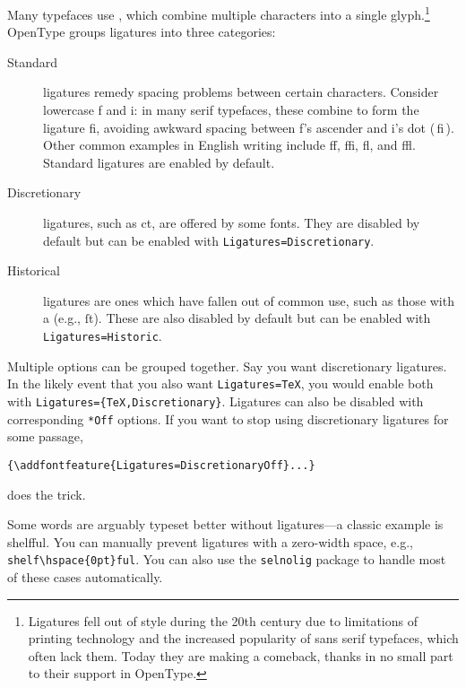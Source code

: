 Many typefaces use , which combine multiple characters
into a single glyph.\punckern\footnote{Ligatures fell out
of style during the 20{th}
century due to limitations of printing technology and the increased popularity
of sans serif typefaces, which often lack them.
Today they are making a comeback,
thanks in no small part to their support in OpenType.}
OpenType groups ligatures into three categories:
\begin{description}
\item[Standard] ligatures remedy spacing problems between certain characters.
    Consider lowercase f and i: in many serif typefaces,
    these combine to form the ligature fi,
    avoiding awkward spacing between f's ascender and i's dot
    { (\,fi\,)}.
    Other common examples in English writing include ff,
    ffi, fl, and ffl.
    Standard ligatures are enabled by default.
\item[Discretionary] ligatures, such as
    {ct},
    are offered by some fonts.
    They are disabled by default
    but can be enabled with
    \verb|Ligatures=Discretionary|.
\item[Historical] ligatures are ones which have fallen out of common use,
    such as those with a  (e.g., ſt).
    These are also disabled by default
    but can be enabled with \verb|Ligatures=Historic|.
\end{description}
Multiple options can be grouped together.
Say you want discretionary ligatures.
In the likely event that you also want \verb|Ligatures=TeX|,
you would enable both with
\verb|Ligatures={TeX,Discretionary}|.
Ligatures can also be disabled with corresponding \verb|*Off|
options. If you want to stop using discretionary ligatures for some passage,
\begin{leftfigure}
\begin{lstlisting}
{\addfontfeature{Ligatures=DiscretionaryOff}...}
\end{lstlisting}
\end{leftfigure}
does the trick.

Some words are arguably typeset better without ligatures---a classic example
is shelfful.\punckern{}
You can manually prevent ligatures with a zero-width
space, e.g., \verb|shelf\hspace{0pt}ful|.
You can also use the \texttt{selnolig} package to handle most of these cases
automatically.

